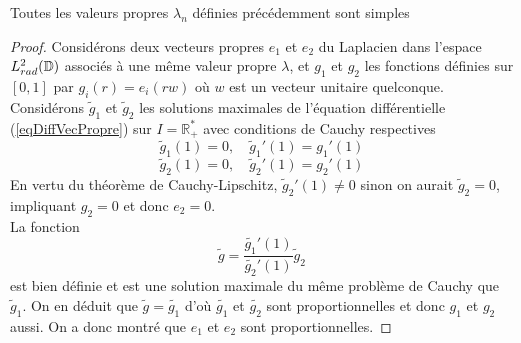 \documentclass[11pt,a4paper]{article}
\begin{document}
\begin{Prop} Toutes les valeurs propres $\lambda_n$ définies précédemment sont simples
\begin{proof}
Considérons deux vecteurs propres $e_1$ et $e_2$ du Laplacien dans l'espace $L^2_{rad}(\mathbb{D})$ associés à une même valeur propre $\lambda$, et $g_1$ et $g_2$ les fonctions définies sur $[0,1]$ par $g_i(r) = e_i(rw)$ où $w$ est un vecteur unitaire quelconque. Considérons $\tilde{g}_1$ et $\tilde{g}_2$ les solutions maximales de l'équation différentielle  (\ref{eqDiffVecPropre}) sur $I = \mathbb{R}_+^*$ avec conditions de Cauchy respectives \[\tilde{g}_1(1) = 0, \quad\tilde{g}_1'(1) = g_1'(1)\] \[\tilde{g}_2(1) = 0, \quad \tilde{g}_2'(1) = g_2'(1)\] En vertu du théorème de Cauchy-Lipschitz, $\tilde{g}_2'(1) \neq 0$ sinon on aurait $\tilde{g}_2 = 0$, impliquant $g_2 = 0$ et donc $e_2=0$. \\La fonction \[\tilde{g} = \dfrac{\tilde{g_1}'(1)}{\tilde{g_2}'(1)}\tilde{g}_2\] est bien définie et est une solution maximale du même problème de Cauchy que $\tilde{g}_1$. On en déduit que $\tilde{g} = \tilde{g_1}$ d'où $\tilde{g_1}$ et $\tilde{g_2}$ sont proportionnelles et donc $g_1$ et $g_2$ aussi. On a donc montré que $e_1$ et $e_2$ sont proportionnelles. 
\end{proof}
\end{Prop}
\end{document}
